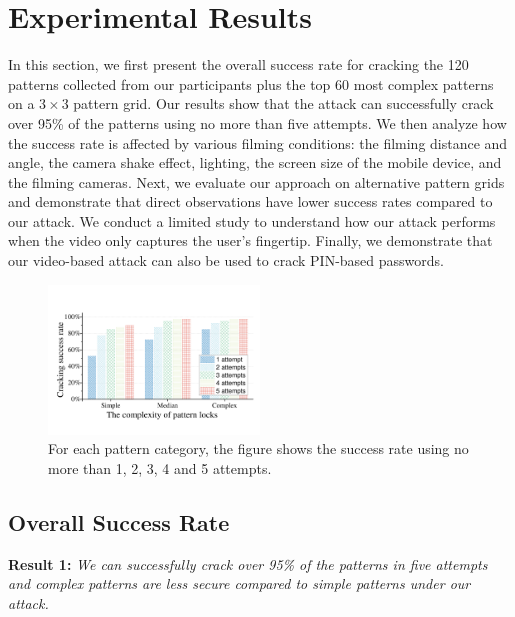 \section{Experimental Results}
    In this section, we first present the overall success rate for cracking
    the 120 patterns collected from our participants plus the top 60 most complex patterns
    on a $3\times3$ pattern grid.
    Our results show that the attack can successfully crack over 95\% of the
    patterns using no more than five attempts. We then analyze how the
     success rate is affected by various filming conditions: the filming distance and angle,
    the camera shake effect, lighting, the screen size of the mobile device, and the filming cameras. Next, we evaluate our approach on alternative pattern grids and demonstrate that direct observations have lower success rates compared to our attack.
    We conduct a limited study to understand how our attack performs when the video only captures the user's fingertip.
     Finally, we demonstrate that our video-based attack can also be used to crack PIN-based passwords.
     
\begin{figure}[!t]
    \centering
    \includegraphics[width=0.5\textwidth]{fig/10.pdf}
    \caption{For each pattern category, the figure shows the success rate using no more than 1, 2, 3, 4 and 5 attempts.}
    \label{fig:fig10}
\end{figure}

    \subsection{Overall Success Rate \label{sec:overall_rate}}

    \noindent \textbf{Result 1:}  \emph{We can successfully crack over 95\% of the patterns in five attempts and complex patterns are less secure compared to simple patterns under our attack.}

